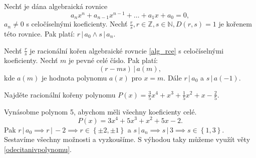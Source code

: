 \begin{veta}
    Nechť je dána algebraická rovnice
    \begin{equation}\label{alg_rce}
        a_nx^n + a_{n-1}x^{n-1}+\dots + a_1x+a_0=0,
    \end{equation}
    $a_n \ne 0$ s celočíselnými koeficienty. Nechť $\frac{r}{s}, r\in \mathbb Z, s \in \mathbb N, D(r,s)=1$ je kořenem této rovnice.
    Pak platí: $r \, | \, a_0 \land s \, |\, a_n.$
\end{veta}

\begin{veta}\label{odecitanivpolynomu}
    Nechť $\frac{r}{s}$ je racionální kořen algebraické rovncie \ref{alg_rce} s celočíselnými koeficienty.
    Nechť $m$ je pevné celé číslo. Pak platí:
    $$(r-ms) \, |\, a(m),$$
    kde $a(m)$ je hodnota polynomu $a(x)$ pro $x=m.$ Dále $r \, | \, a_0$ a $s\, |\, a(-1).$
\end{veta}

\begin{comment}
\begin{veta}[Hledání racionálních kořenů polynomu s racionálními koeficienty]
  Mějme polynom $P(x) \in \mathbb Q [x]$. Potom najdeme jeho kořeny $\frac{r}{s} \in \mathbb Q$ takto:
  \begin{enumerate}[1.]
    \item Nalezneme všechny celočíselné dělitele $r$ absolutního členu polynomu $a_0$.
    \item Nalezneme všechny přirozené dělitele $s$ vedoucího členu $a_n$.
    \item Utvoříme všechny zlomky tvaru $\frac{r}{s}, (r,s) = 1$.
    \item Hornerovým schématem určíme $P(1)$, případně $P(-1)$ ($1$ a $-1$ také mohou být kořeny).
    \item Vyškrtáme ty zlomky $\frac{r}{s}$, které nesplňují podmínky $(r-s) \mid P(1) \land (r+s) \mid P(-1)$.
    \item U ostatních zlomků vyzkoušíme Hornerovým schématem, zda jsou kořeny daného polynomu.
  \end{enumerate}
\end{veta}
\end{comment}

\begin{priklad}
Najděte racionální kořeny polynomu $P(x)=\frac{3}{5}x^4+x^3+\frac{1}{5}x^2+x-\frac{2}{5}.$
\end{priklad}

\begin{reseni}
Vynásobme polynom 5, abychom měli všechny koeficienty celé.
$$P(x) = 3x^4+5x^3+x^2+5x-2.$$
Pak $r \, | \, a_0 \implies r\, | \, -2 \implies r \in \left \{ \pm 2, \pm 1 \right \} $
a $s \, | \, a_n\implies s \, | \, 3 \implies s \in \left \{ 1, 3 \right \} $.
Sestavíme všechny možnosti a vyzkoušíme. S výhodou taky můžeme využít věty
\ref{odecitanivpolynomu}.
\end{reseni}


